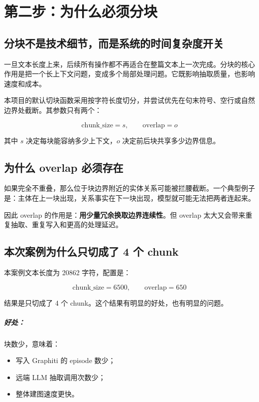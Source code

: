 \documentclass[UTF8,10pt,oneside]{ctexbook}
\begin{document}
\chapter{第二步：为什么必须分块}

\section{分块不是技术细节，而是系统的时间复杂度开关}

一旦文本长度上来，后续所有操作都不再适合在整篇文本上一次完成。分块的核心作用是把一个长上下文问题，变成多个局部处理问题。它既影响抽取质量，也影响速度和成本。

本项目的默认切块函数采用按字符长度切分，并尝试优先在句末符号、空行或自然边界处截断。其参数只有两个：

\[
\text{chunk\_size} = s,\qquad \text{overlap} = o
\]

其中 \(s\) 决定每块能容纳多少上下文，\(o\) 决定前后块共享多少边界信息。

\section{为什么 overlap 必须存在}

如果完全不重叠，那么位于块边界附近的实体关系可能被拦腰截断。一个典型例子是：主体在上一块出现，关系事实在下一块出现，模型就可能无法把两者连起来。

因此 overlap 的作用是：\textbf{用少量冗余换取边界连续性}。但 overlap 太大又会带来重复抽取、重复写入和更高的处理延迟。

\section{本次案例为什么只切成了 4 个 chunk}

本案例文本长度为 20862 字符，配置是：

\[
\text{chunk\_size}=6500,\qquad \text{overlap}=650
\]

结果是只切成了 4 个 chunk。这个结果有明显的好处，也有明显的问题。

\paragraph{好处：}
块数少，意味着：
\begin{itemize}
  \item 写入 Graphiti 的 episode 数少；
  \item 远端 LLM 抽取调用次数少；
  \item 整体建图速度更快。
\end{itemize}
\end{document}
